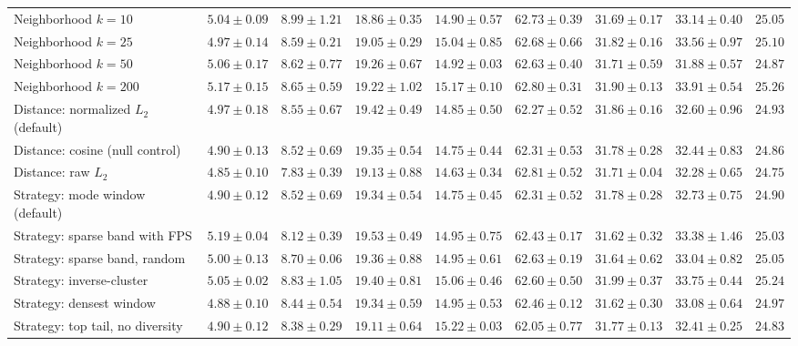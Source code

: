 \begin{table}[t]
\begin{adjustbox}{max width=\textwidth}
\begin{tabular}{lcccccccc}
Neighborhood $k=10$ & $5.04\pm0.09$ & $8.99\pm1.21$ & $18.86\pm0.35$ & $14.90\pm0.57$ & $62.73\pm0.39$ & $31.69\pm0.17$ & $33.14\pm0.40$ & $25.05$ \\
Neighborhood $k=25$ & $4.97\pm0.14$ & $8.59\pm0.21$ & $19.05\pm0.29$ & $15.04\pm0.85$ & $62.68\pm0.66$ & $31.82\pm0.16$ & $33.56\pm0.97$ & $25.10$ \\
Neighborhood $k=50$ & $5.06\pm0.17$ & $8.62\pm0.77$ & $19.26\pm0.67$ & $14.92\pm0.03$ & $62.63\pm0.40$ & $31.71\pm0.59$ & $31.88\pm0.57$ & $24.87$ \\
Neighborhood $k=200$ & $5.17\pm0.15$ & $8.65\pm0.59$ & $19.22\pm1.02$ & $15.17\pm0.10$ & $62.80\pm0.31$ & $31.90\pm0.13$ & $33.91\pm0.54$ & $25.26$ \\
Distance: normalized $L_2$ (default) & $4.97\pm0.18$ & $8.55\pm0.67$ & $19.42\pm0.49$ & $14.85\pm0.50$ & $62.27\pm0.52$ & $31.86\pm0.16$ & $32.60\pm0.96$ & $24.93$ \\
Distance: cosine (null control) & $4.90\pm0.13$ & $8.52\pm0.69$ & $19.35\pm0.54$ & $14.75\pm0.44$ & $62.31\pm0.53$ & $31.78\pm0.28$ & $32.44\pm0.83$ & $24.86$ \\
Distance: raw $L_2$ & $4.85\pm0.10$ & $7.83\pm0.39$ & $19.13\pm0.88$ & $14.63\pm0.34$ & $62.81\pm0.52$ & $31.71\pm0.04$ & $32.28\pm0.65$ & $24.75$ \\
Strategy: mode window (default) & $4.90\pm0.12$ & $8.52\pm0.69$ & $19.34\pm0.54$ & $14.75\pm0.45$ & $62.31\pm0.52$ & $31.78\pm0.28$ & $32.73\pm0.75$ & $24.90$ \\
Strategy: sparse band with FPS & $5.19\pm0.04$ & $8.12\pm0.39$ & $19.53\pm0.49$ & $14.95\pm0.75$ & $62.43\pm0.17$ & $31.62\pm0.32$ & $33.38\pm1.46$ & $25.03$ \\
Strategy: sparse band, random & $5.00\pm0.13$ & $8.70\pm0.06$ & $19.36\pm0.88$ & $14.95\pm0.61$ & $62.63\pm0.19$ & $31.64\pm0.62$ & $33.04\pm0.82$ & $25.05$ \\
Strategy: inverse-cluster & $5.05\pm0.02$ & $8.83\pm1.05$ & $19.40\pm0.81$ & $15.06\pm0.46$ & $62.60\pm0.50$ & $31.99\pm0.37$ & $33.75\pm0.44$ & $25.24$ \\
Strategy: densest window & $4.88\pm0.10$ & $8.44\pm0.54$ & $19.34\pm0.59$ & $14.95\pm0.53$ & $62.46\pm0.12$ & $31.62\pm0.30$ & $33.08\pm0.64$ & $24.97$ \\
Strategy: top tail, no diversity & $4.90\pm0.12$ & $8.38\pm0.29$ & $19.11\pm0.64$ & $15.22\pm0.03$ & $62.05\pm0.77$ & $31.77\pm0.13$ & $32.41\pm0.25$ & $24.83$ \\
\bottomrule
\end{tabular}
\end{adjustbox}
\end{table}

